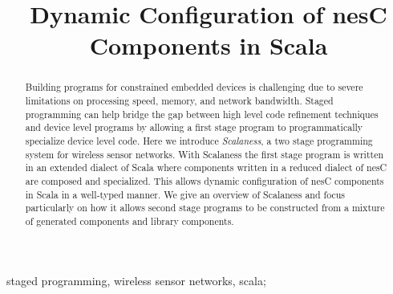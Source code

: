 \title{Dynamic Configuration of nesC Components in Scala}
\author{
\and
{}
\and
{}
}
\maketitle

\begin{abstract}
  Building programs for constrained embedded devices is challenging
  due to severe limitations on processing speed, memory, and network
  bandwidth. Staged programming can help bridge the gap between high
  level code refinement techniques and device level programs by
  allowing a first stage program to programmatically specialize device
  level code. Here we introduce \textit{Scalaness}, a two stage
  programming system for wireless sensor networks. With Scalaness the
  first stage program is written in an extended dialect of Scala where
  components written in a reduced dialect of nesC are composed and
  specialized. This allows dynamic configuration of nesC components in
  Scala in a well-typed manner. We give an overview of Scalaness and
  focus particularly on how it allows second stage programs to be
  constructed from a mixture of generated components and library
  components.
\end{abstract}

\begin{IEEEkeywords}
staged programming, wireless sensor networks, scala;
\end{IEEEkeywords}
